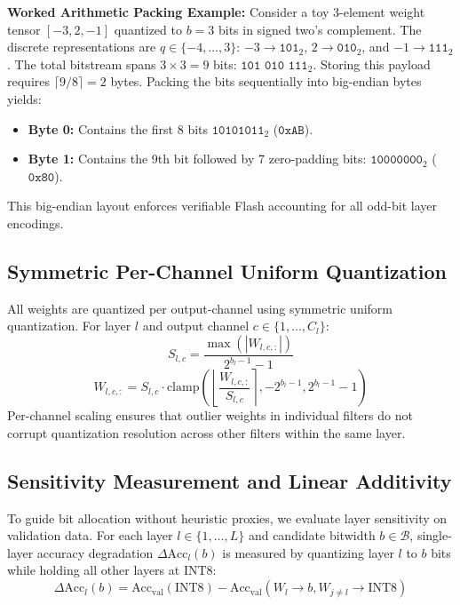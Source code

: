 \documentclass{ieeeaccess}
\begin{document}
\textbf{Worked Arithmetic Packing Example:} Consider a toy 3-element weight tensor $[-3, 2, -1]$ quantized to $b = 3$ bits in signed two's complement. The discrete representations are $q \in \{-4, \dots, 3\}$: $-3 \to \texttt{101}_2$, $2 \to \texttt{010}_2$, and $-1 \to \texttt{111}_2$. The total bitstream spans $3 \times 3 = 9$ bits: $\texttt{101 010 111}_2$. Storing this payload requires $\lceil 9/8 \rceil = 2$ bytes. Packing the bits sequentially into big-endian bytes yields:
\begin{itemize}
    \item \textbf{Byte 0:} Contains the first 8 bits $\texttt{10101011}_2$ ($\texttt{0xAB}$).
    \item \textbf{Byte 1:} Contains the 9th bit followed by 7 zero-padding bits: $\texttt{10000000}_2$ ($\texttt{0x80}$).
\end{itemize}
This big-endian layout enforces verifiable Flash accounting for all odd-bit layer encodings.

\subsection{Symmetric Per-Channel Uniform Quantization}
All weights are quantized per output-channel using symmetric uniform quantization. For layer $l$ and output channel $c \in \{1, \dots, C_l\}$:
\begin{equation}
\label{eq:scale}
S_{l, c} = \frac{\max(|W_{l, c, :}|)}{2^{b_l - 1} - 1}
\end{equation}
\begin{equation}
\label{eq:quant}
\hat{W}_{l, c, :} = S_{l, c} \cdot \text{clamp}\left( \left\lfloor \frac{W_{l, c, :}}{S_{l, c}} \right\rceil, -2^{b_l-1}, 2^{b_l-1}-1 \right)
\end{equation}
Per-channel scaling ensures that outlier weights in individual filters do not corrupt quantization resolution across other filters within the same layer.

\subsection{Sensitivity Measurement and Linear Additivity}
To guide bit allocation without heuristic proxies, we evaluate layer sensitivity on validation data. For each layer $l \in \{1, \dots, L\}$ and candidate bitwidth $b \in \mathcal{B}$, single-layer accuracy degradation $\Delta \text{Acc}_l(b)$ is measured by quantizing layer $l$ to $b$ bits while holding all other layers at INT8:
\begin{equation}
\Delta \text{Acc}_l(b) = \text{Acc}_{\text{val}}(\text{INT8}) - \text{Acc}_{\text{val}}(W_l \to b, W_{j \ne l} \to \text{INT8})
\end{equation}
\end{document}
